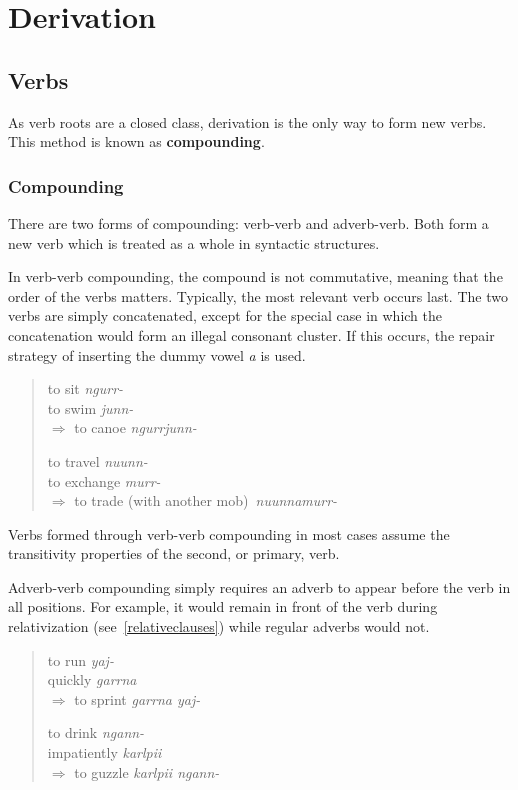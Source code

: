 \chapter{Derivation}

\section{Verbs}

As verb roots are a closed class, derivation is the only way to form new verbs.
This method is known as \textbf{compounding}.

\subsection{Compounding}

There are two forms of compounding: verb-verb and adverb-verb. Both form a new
verb which is treated as a whole in syntactic structures.

In verb-verb compounding, the compound is not commutative, meaning that the
order of the verbs matters. Typically, the most relevant verb occurs last. The
two verbs are simply concatenated, except for the special case in which the
concatenation would form an illegal consonant cluster. If this occurs, the
repair strategy of inserting the dummy vowel \textit{a} is used.

\begin{quote}
\begin{multicols}{2}
to sit \textit{ngurr-}\\
to swim \textit{junn-}\\
$\Rightarrow$ to canoe \textit{ngurrjunn-}

to travel \textit{nuunn-}\\
to exchange \textit{murr-}\\
$\Rightarrow$ to trade (with another mob)~\textit{nuunnamurr-}
\end{multicols}
\end{quote}

Verbs formed through verb-verb compounding in most cases assume the transitivity
properties of the second, or primary, verb.

Adverb-verb compounding simply requires an adverb to appear before the verb in
all positions. For example, it would remain in front of the verb during
relativization (see~\ref{relativeclauses}) while regular adverbs would not.

\begin{quote}
\begin{multicols}{2}
to run \textit{yaj-}\\
quickly \textit{garrna}\\
$\Rightarrow$ to sprint \textit{garrna yaj-}

to drink \textit{ngann-}\\
impatiently \textit{karlpii}\\
$\Rightarrow$ to guzzle \textit{karlpii ngann-}
\end{multicols}
\end{quote}

